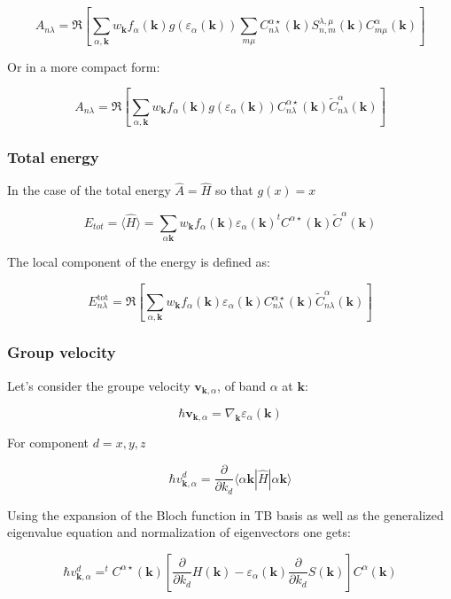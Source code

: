 \documentclass{article}
\newcommand{\bra}[1]{\langle #1|}
\newcommand{\ket}[1]{|#1\rangle}
\newcommand{\op}[1]{\hat{#1}}
\begin{document}
\[ A_{n \lambda}=\Re \left[ 
\sum_{\alpha,\mathbf{k}} w_{\mathbf{k}} f_{\alpha}(\mathbf{k})g(\varepsilon_{\alpha}(\mathbf{k})) \sum_{m \mu} C_{n \lambda}^{\alpha \star}(\mathbf{k})
S_{n,m}^{\lambda,\mu}(\mathbf{k})C_{m \mu}^{\alpha}(\mathbf{k}) \right] \]

\noindent
Or in a more compact form:

\[ A_{n \lambda}=\Re \left[ 
\sum_{\alpha,\mathbf{k}} w_{\mathbf{k}} f_{\alpha}(\mathbf{k})g(\varepsilon_{\alpha}(\mathbf{k})) 
C_{n \lambda}^{\alpha \star}(\mathbf{k}) \widetilde{C}_{n \lambda}^{\alpha}(\mathbf{k}) \right]
 \]

\subsubsection{Total energy}

\noindent
In the case of the total energy $\op{A}=\op{H} $ so that $g(x)=x$

\[E_{tot}=\langle \op{H}\rangle=\sum_{\alpha \mathbf{k}} w_{\mathbf{k}}
f_{\alpha}(\mathbf{k})\varepsilon_{\alpha}(\mathbf{k})
^tC^{\alpha \star}(\mathbf{k})\widetilde{C}^{\alpha}(\mathbf{k}) \]

 \noindent
The local component of the energy is defined as:

\[ E_{n \lambda}^{\text{tot}}=\Re \left[ 
\sum_{\alpha,\mathbf{k}} w_{\mathbf{k}} f_{\alpha}(\mathbf{k})\varepsilon_{\alpha}(\mathbf{k})
C_{n \lambda}^{\alpha \star}(\mathbf{k}) \widetilde{C}_{n \lambda}^{\alpha}(\mathbf{k}) \right]
 \]

\subsubsection{Group velocity }

Let's consider the groupe velocity $\mathbf{v}_{\mathbf{k},\alpha}$, of band $\alpha$ at $\mathbf{k}$:

\[ \hbar \mathbf{v}_{\mathbf{k},\alpha}=\nabla_{\mathbf{k}} \varepsilon_{\alpha}(\mathbf{k})\]

\noindent
For component $d=x,y,z$

\[ \hbar v_{\mathbf{k},\alpha}^{d}=\frac{\partial}{\partial k_{d}} \bra{\alpha \mathbf{k}} \op{H} \ket{\alpha \mathbf{k}}\]

\noindent
Using the expansion of the Bloch function in TB basis as well as the generalized eigenvalue equation and normalization of eigenvectors one gets:

\[ \hbar v_{\mathbf{k},\alpha}^{d}= ^tC^{\alpha \star}(\mathbf{k}) \left [\frac{\partial}{\partial k_{d}} H(\mathbf{k})  -\varepsilon_{\alpha}(\mathbf{k}) \frac{\partial}{\partial k_{d}} S(\mathbf{k}) \right] C^{\alpha}(\mathbf{k})\]
\end{document}
